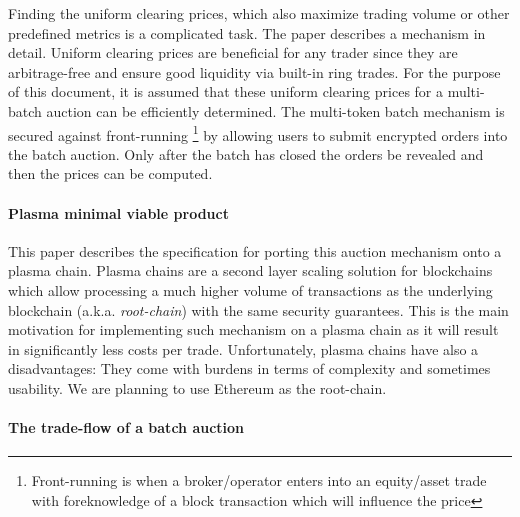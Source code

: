 \documentclass[11pt,parskip=full]{scrartcl}%
\begin{document}
Finding the uniform clearing prices, which also maximize trading volume or other predefined metrics is a complicated task. The paper \cite{priceOptimization} describes a mechanism in detail. Uniform clearing prices are beneficial for any trader since they are arbitrage-free and ensure good liquidity via built-in ring trades. For the purpose of this document, it is assumed that these uniform clearing prices for a multi-batch auction can be efficiently determined. \newline
The multi-token batch mechanism is secured against front-running \footnote{Front-running is when a broker/operator enters into an equity/asset trade with foreknowledge of a block transaction which will influence the price} by allowing users to submit encrypted orders into the batch auction. Only after the batch has closed the orders be revealed and then the prices can be computed. 


\paragraph{Plasma minimal viable product}

This paper describes the specification for porting this auction mechanism onto a plasma chain. Plasma chains are a second layer scaling solution for blockchains which allow processing a much higher volume of transactions as the underlying blockchain (a.k.a. \emph{root-chain}) with the same security guarantees. This is the main motivation for implementing such mechanism on a plasma chain as it will result in significantly less costs per trade. Unfortunately, plasma chains have also a disadvantages: They come with burdens in terms of complexity and sometimes usability. We are planning to use Ethereum as the root-chain. 

\paragraph{The trade-flow of a batch auction}  
\end{document}
